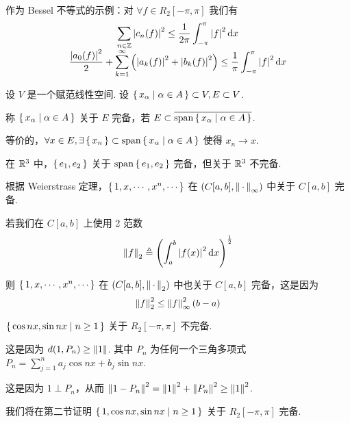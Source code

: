 作为 Bessel 不等式的示例：对 $\forall f\in R_2[-\pi,\pi]$ 我们有
$$
\begin{array}{c}
    \displaystyle\sum_{n\in\mathbb{Z}}\left\lvert{c_n(f)}\right\rvert^2\le\frac{1}{2\pi}\int_{-\pi}^\pi\left\lvert{f}\right\rvert^2\mathrm{d} x\\
    \displaystyle\frac{\left\lvert{a_0(f)}\right\rvert^2}{2}+\sum_{k=1}^\infty\left(\left\lvert{a_k(f)}\right\rvert^2+\left\lvert{b_k(f)}\right\rvert^2\right)\le\frac{1}{\pi}\int_{-\pi}^\pi\left\lvert{f}\right\rvert^2\mathrm{d} x
\end{array}
$$


\begin{definition}
    设 $V$ 是一个赋范线性空间. 设 $\set{x_\alpha|\alpha\in A}\subset V,E\subset V$.

    称 $\set{x_\alpha|\alpha\in A}$ 关于 $E$ 完备，若 $E\subset\overline{\mathrm{span}\set{x_\alpha|\alpha\in A}}$.

    等价的，$\forall x\in E,\exists\set{x_n}\subset\mathrm{span}\set{x_\alpha|\alpha\in A}$ 使得 $x_n\to x$.
\end{definition}

\begin{example}
    在 $\mathbb{R}^3$ 中，$\set{e_1,e_2}$ 关于 $\mathrm{span}\set{e_1,e_2}$ 完备，但关于 $\mathbb{R}^3$ 不完备.
\end{example}

\begin{example}
    根据 Weierstrass 定理，$\set{1,x,\cdots,x^n,\cdots}$ 在 $(C[a,b],\left\lVert{\,\cdot\,}\right\rVert_\infty)$ 中关于 $C[a,b]$ 完备.
\end{example}

\begin{hint}
    若我们在 $C[a,b]$ 上使用 2 范数
$$
\left\lVert{f}\right\rVert_2\triangleq\left(\int_a^b\left\lvert{f(x)}\right\rvert^2\mathrm{d} x\right)^\frac{1}{2}
$$

    则 $\set{1,x,\cdots,x^n,\cdots}$ 在 $(C[a,b],\left\lVert{\,\cdot\,}\right\rVert_2)$ 中也关于 $C[a,b]$ 完备，这是因为
$$
\left\lVert{f}\right\rVert_2^2\le\left\lVert{f}\right\rVert_\infty^2(b-a)
$$
\end{hint}

\begin{example}
    $\set{\cos nx,\sin nx|n\ge 1}$ 关于 $R_2[-\pi,\pi]$ 不完备.

    这是因为 $d(1,P_n)\ge\left\lVert{1}\right\rVert$. 其中 $P_n$ 为任何一个三角多项式 $P_n=\sum\limits_{j=1}^na_j\cos nx+b_j\sin nx$.

    这是因为 $1\perp P_n$，从而 $\left\lVert{1-P_n}\right\rVert^2=\left\lVert{1}\right\rVert^2+\left\lVert{P_n}\right\rVert^2\ge\left\lVert{1}\right\rVert^2$.
\end{example}

\begin{hint}
    我们将在第二节证明 $\set{1,\cos nx,\sin nx|n\ge 1}$ 关于 $R_2[-\pi,\pi]$ 完备.
\end{hint}

